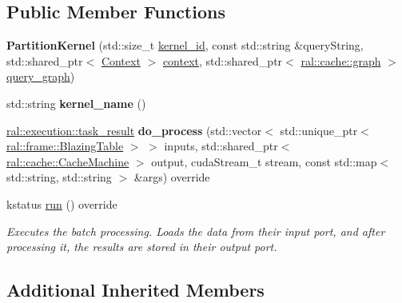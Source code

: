 \subsection*{Public Member Functions}
\begin{DoxyCompactItemize}
\item 
\mbox{\label{classral_1_1batch_1_1PartitionKernel_ab109a0b947c7dc2658e1140be205c966}} 
{\bfseries Partition\+Kernel} (std\+::size\+\_\+t \hyperlink{classral_1_1cache_1_1kernel_a2fd708656cb056a41ec635b8bdc4acfe}{kernel\+\_\+id}, const std\+::string \&query\+String, std\+::shared\+\_\+ptr$<$ \hyperlink{classblazingdb_1_1manager_1_1Context}{Context} $>$ \hyperlink{classral_1_1cache_1_1kernel_af0347d14d678cfa7205c1387746a2e1b}{context}, std\+::shared\+\_\+ptr$<$ \hyperlink{classral_1_1cache_1_1graph}{ral\+::cache\+::graph} $>$ \hyperlink{classral_1_1cache_1_1kernel_a5fbb02292aff165a28ef25e75f0d89bd}{query\+\_\+graph})
\item 
\mbox{\label{classral_1_1batch_1_1PartitionKernel_a2144e1eba4558e98a8189ecabfb0dc0f}} 
std\+::string {\bfseries kernel\+\_\+name} ()
\item 
\mbox{\label{classral_1_1batch_1_1PartitionKernel_a5811971dfad58c689bcd04f7ff897db2}} 
\hyperlink{structral_1_1execution_1_1task__result}{ral\+::execution\+::task\+\_\+result} {\bfseries do\+\_\+process} (std\+::vector$<$ std\+::unique\+\_\+ptr$<$ \hyperlink{classral_1_1frame_1_1BlazingTable}{ral\+::frame\+::\+Blazing\+Table} $>$ $>$ inputs, std\+::shared\+\_\+ptr$<$ \hyperlink{classral_1_1cache_1_1CacheMachine}{ral\+::cache\+::\+Cache\+Machine} $>$ output, cuda\+Stream\+\_\+t stream, const std\+::map$<$ std\+::string, std\+::string $>$ \&args) override
\item 
kstatus \hyperlink{classral_1_1batch_1_1PartitionKernel_a5313617a63ab0fb23a0e4211399f439f}{run} () override
\begin{DoxyCompactList}\small\item\em Executes the batch processing. Loads the data from their input port, and after processing it, the results are stored in their output port. \end{DoxyCompactList}\end{DoxyCompactItemize}
\subsection*{Additional Inherited Members}


